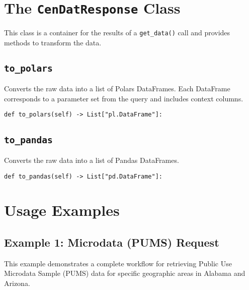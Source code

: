 \documentclass{article}
\begin{document}
\section{The \texttt{CenDatResponse} Class}
This class is a container for the results of a \texttt{get\_data()} call and provides methods to transform the data.

\subsection{\texttt{to\_polars}}
Converts the raw data into a list of Polars DataFrames. Each DataFrame corresponds to a parameter set from the query and includes context columns.
\begin{verbatim}
def to_polars(self) -> List["pl.DataFrame"]:
\end{verbatim}

\subsection{\texttt{to\_pandas}}
Converts the raw data into a list of Pandas DataFrames.
\begin{verbatim}
def to_pandas(self) -> List["pd.DataFrame"]:
\end{verbatim}

\newpage
\section{Usage Examples}

\subsection{Example 1: Microdata (PUMS) Request}
This example demonstrates a complete workflow for retrieving Public Use Microdata Sample (PUMS) data for specific geographic areas in Alabama and Arizona.
\end{document}
